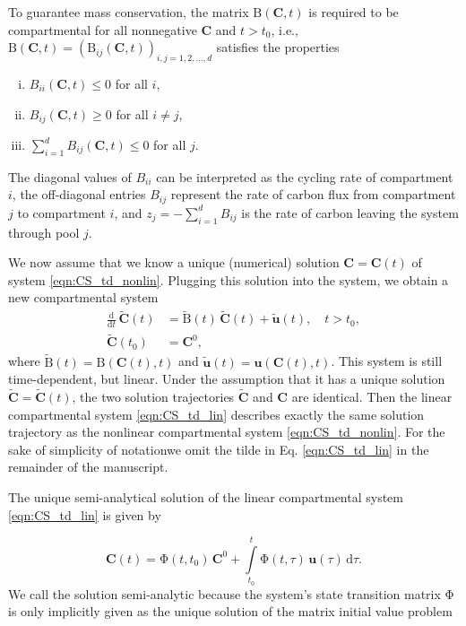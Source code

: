 \documentclass[draft]{agujournal2019}
\renewcommand{\vec}[1]{\mathbf{#1}}
\newcommand{\tens}[1]{\mathrm{#1}}
\newcommand{\deriv}[1]{\frac{\mathrm{d}}{\mathrm{d}#1}}
\newcommand{\dd}[1]{\,\mathrm{d}#1}
\newcommand{\intl}{\int\limits}
\newcommand{\suml}{\sum\limits}
\providecommand{\DIFadd}[1]{{\protect\color{blue}\uwave{#1}}} %
\providecommand{\DIFaddbegin}{} %
\providecommand{\DIFaddend}{} %
\begin{document}
To guarantee mass conservation, the matrix $\tens{B}(\vec{C},t)$ is required to be compartmental 
for all nonnegative $\vec{C}$ and $t>t_0$, i.e., $\tens{B}(\vec{C},t)=(\tens{B}_{ij}(\vec{C},t))_{i,j=1,2,\ldots,d}$ satisfies the properties
     \begin{enumerate} [(i)]
        \item $B_{ii}(\vec{C},t)\leq0$ for all $i$,
        \item $B_{ij}(\vec{C},t)\geq0$ for all $i\neq j$,
        \item $\suml_{i=1}^d B_{ij}(\vec{C},t)\leq0$ for all $j$.
     \end{enumerate} 
The diagonal values of $B_{ii}$ can be interpreted as the cycling rate of compartment $i$, the off-diagonal entries $B_{ij}$ represent the rate of carbon flux from compartment $j$ to compartment $i$, and $z_j=-\sum_{i=1}^d B_{ij}$ is the rate of carbon leaving the system through pool $j$.

    We now assume that we know a unique (numerical) solution $\vec{C}=\vec{C}(t)$ of system \eqref{eqn:CS_td_nonlin}.
    Plugging this solution into the system, we obtain a new compartmental system
    \begin{equation}\label{eqn:CS_td_lin}
        \begin{aligned}
            \deriv{t}\,\widetilde{\vec{C}}(t) &= \widetilde{\tens{B}}(t)\,\widetilde{\vec{C}}(t) + \widetilde{\vec{u}}(t),\quad t>t_0,\\
            \widetilde{\vec{C}}(t_0) &= \vec{C}^0,
        \end{aligned}
    \end{equation}
    where $\widetilde{\tens{B}}(t)=\tens{B}(\vec{C}(t),t)$ and $\widetilde{\vec{u}}(t)=\vec{u}(\vec{C}(t),t)$.
    This system is still time-dependent, but linear.
    Under the assumption that it has a unique solution $\widetilde{\vec{C}}=\widetilde{\vec{C}}(t)$, the two solution trajectories $\widetilde{\vec{C}}$ and $\vec{C}$ are identical.
    Then the linear compartmental system \eqref{eqn:CS_td_lin} describes exactly the same solution trajectory as the nonlinear compartmental system \eqref{eqn:CS_td_nonlin}.
    For the sake of simplicity of notation\DIFaddbegin \DIFadd{, }\DIFaddend we omit the tilde in Eq. \eqref{eqn:CS_td_lin} in the remainder of the manuscript.

    The unique semi-analytical solution of the linear compartmental system \eqref{eqn:CS_td_lin} is given by \cite{Brockett2015}

    \begin{equation*}
        \vec{C}(t) = \tens{\Phi}(t,t_0)\,\vec{C}^0 + \intl_{t_0}^t \tens{\Phi}(t,\tau)\,\vec{u}(\tau)\dd{\tau}.
    \end{equation*}
    We call the solution semi-analytic because the system's state transition matrix $\tens{\Phi}$ is only implicitly given as the unique solution of the matrix initial value problem
\end{document}
